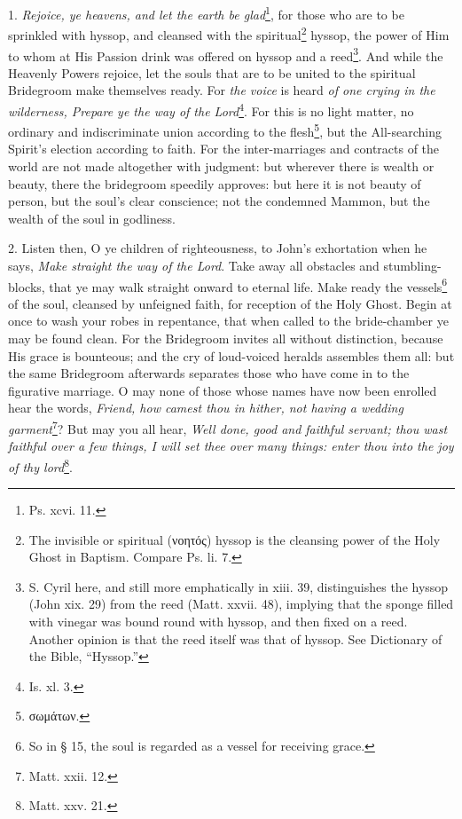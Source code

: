 1. \emph{Rejoice, ye heavens, and let the earth be glad}\footnote{Ps. xcvi. 11.}, for those who are to be sprinkled with hyssop, and cleansed with the spiritual\footnote{The invisible or spiritual (\textgreek{νοητός}) hyssop is the cleansing power of the Holy Ghost in Baptism. Compare Ps. li. 7.} hyssop, the power of Him to whom at His Passion drink was offered on hyssop and a reed\footnote{S. Cyril here, and still more emphatically in xiii. 39, distinguishes the hyssop (John xix. 29) from the reed (Matt. xxvii. 48), implying that the sponge filled with vinegar was bound round with hyssop, and then fixed on a reed. Another opinion is that the reed itself was that of hyssop. See Dictionary of the Bible, “Hyssop.”}. And while the Heavenly Powers rejoice, let the souls that are to be united to the spiritual Bridegroom make themselves ready. For \emph{the voice} is heard \emph{of one crying in the wilderness, Prepare ye the way of the Lord}\footnote{Is. xl. 3.}. For this is no light matter, no ordinary and indiscriminate union according to the flesh\footnote{\textgreek{σωμάτων}.}, but the All-searching Spirit’s election according to faith. For the inter-marriages and contracts of the world are not made altogether with judgment: but wherever there is wealth or beauty, there the bridegroom speedily approves: but here it is not beauty of person, but the soul’s clear conscience; not the condemned Mammon, but the wealth of the soul in godliness.

2. Listen then, O ye children of righteousness, to John’s exhortation when he says, \emph{Make straight the way of the Lord}. Take away all obstacles and stumbling-blocks, that ye may walk straight onward to eternal life. Make ready the vessels\footnote{So in § 15, the soul is regarded as a vessel for receiving grace.} of the soul, cleansed by unfeigned faith, for reception of the Holy Ghost. Begin at once to wash your robes in repentance, that when called to the bride-chamber ye may be found clean. For the Bridegroom invites all without distinction, because His grace is bounteous; and the cry of loud-voiced heralds assembles them all: but the same Bridegroom afterwards separates those who have come in to the figurative marriage. O may none of those whose names have now been enrolled hear the words, \emph{Friend, how camest thou in hither, not having a wedding garment}\footnote{Matt. xxii. 12.}? But may you all hear, \emph{Well done, good and faithful servant; thou wast faithful over a few things, I will set thee over many things: enter thou into the joy of thy lord}\footnote{Matt. xxv. 21.}.

